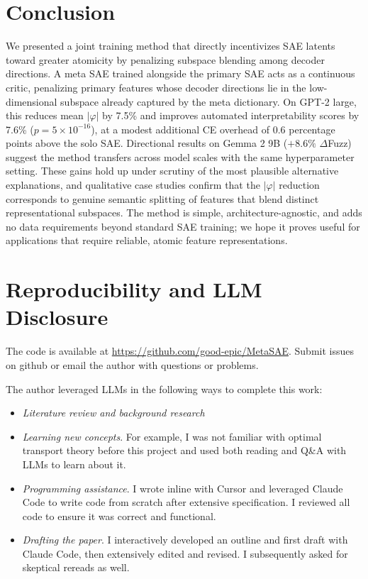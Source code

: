 \documentclass{article} %
\begin{document}
\section{Conclusion}
\label{sec:conclusion}

We presented a joint training method that directly incentivizes SAE latents toward
greater atomicity by penalizing subspace blending among decoder directions.
A meta SAE trained alongside the primary SAE acts as a continuous critic,
penalizing primary features whose decoder directions lie in the low-dimensional
subspace already captured by the meta dictionary.
On GPT-2 large, this reduces mean $|\varphi|$ by 7.5\% and improves automated
interpretability scores by 7.6\% ($p=5\times10^{-16}$), at a modest additional
CE overhead of 0.6 percentage points above the solo SAE.
Directional results on Gemma 2 9B ($+8.6\%$ $\Delta$Fuzz) suggest the method
transfers across model scales with the same hyperparameter setting.
These gains hold up under scrutiny of the most plausible alternative explanations,
and qualitative case studies confirm that the $|\varphi|$ reduction corresponds
to genuine semantic splitting of features that blend distinct representational
subspaces.
The method is simple, architecture-agnostic, and adds no data requirements beyond
standard SAE training; we hope it proves useful for applications that require
reliable, atomic feature representations.

\section{Reproducibility and LLM Disclosure}
\label{sec:reproducibility}
The code is available at \url{https://github.com/good-epic/MetaSAE}.
Submit issues on github or email the author with questions or problems.

The author leveraged LLMs in the following ways to complete this work:
\begin{itemize}
    \item \textit{Literature review and background research}
    \item \textit{Learning new concepts}. For example, I was not familiar with optimal
          transport theory before this project and used both reading and Q\&A with
          LLMs to learn about it.
    \item \textit{Programming assistance}. I wrote inline with Cursor and leveraged Claude Code
          to write code from scratch after extensive specification. I reviewed all code
          to ensure it was correct and functional.
    \item \textit{Drafting the paper}. I interactively developed an outline and first draft with
          Claude Code, then extensively edited and revised. I subsequently asked for skeptical
          rereads as well.
\end{itemize}
\end{document}
